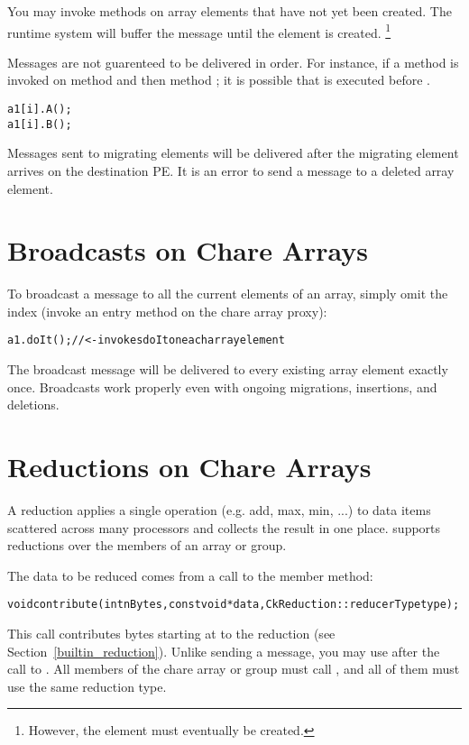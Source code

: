 You may invoke methods on array elements that have not yet been created. The
\charmpp{} runtime system will buffer the message until the element is
created. 
\footnote{However, the element must eventually be created.}

Messages are not guarenteed to be delivered in order. For instance, if a method
is invoked on method  and then method ; it is possible that 
is executed before .
%
\begin{alltt}
a1[i].A();
a1[i].B();
\end{alltt}

Messages sent to migrating elements will be delivered after the migrating
element arrives on the destination PE. It is an error to send a message
to a deleted array element.

\section{Broadcasts on Chare Arrays}

To  broadcast a message to all the current elements of
an array, simply omit the index (invoke an entry method on the chare array
proxy):
%
\begin{alltt}
a1.doIt(); //<- invokes doIt on each array element
\end{alltt}
%
The broadcast message will be delivered to every existing array element exactly
once. Broadcasts work properly even with ongoing migrations, insertions, and
deletions.

\section{Reductions on Chare Arrays}
\label{reductions}

A reduction applies a single operation (e.g. add,
max, min, ...) to data items scattered across many processors and
collects the result in one place.  \charmpp{} supports reductions
over the members of an array or group.

The data to be reduced comes from a call to the member  
method:
\begin{alltt}
void contribute(int nBytes, const void *data, CkReduction::reducerType type);
\end{alltt}

This call contributes  bytes starting at  to the
reduction  (see Section~\ref{builtin_reduction}).  Unlike sending a
message, you may use  after the call to .  All
members of the chare array or group must call , 
and all of them must use the same reduction type.  


